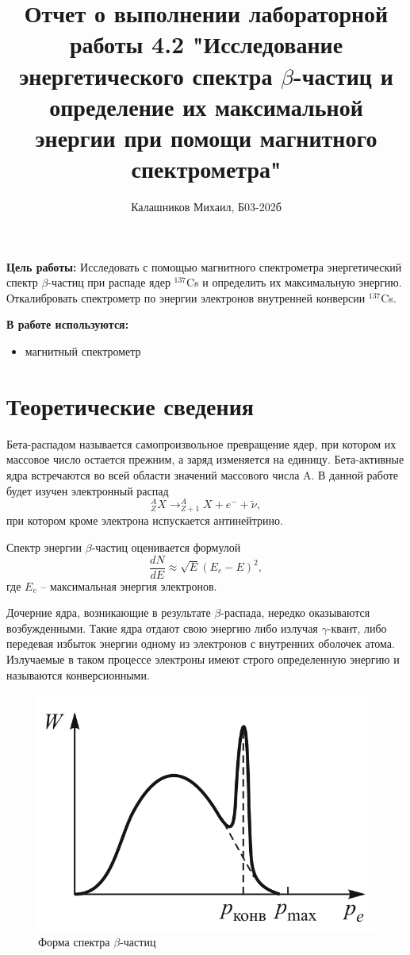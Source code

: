 \documentclass[14pt, a4paper]{report}
\title{\textbf{Отчет о выполнении лабораторной работы 4.2 "Исследование энергетического спектра $\beta$-частиц и определение их максимальной энергии при помощи магнитного спектрометра"}}
\author{Калашников Михаил, Б03-202б}
\date{}
\begin{document}
\maketitle

\textbf{Цель работы:}
Исследовать с помощью магнитного спектрометра энергетический спектр $\beta$-частиц при распаде ядер $^{137}$Cs и определить их максимальную энергию. Откалибровать спектрометр по энергии электронов внутренней конверсии $^{137}$Cs.

\textbf{В работе используются:}
\begin{itemize}
\item магнитный спектрометр
\end{itemize}

\section{Теоретические сведения}

Бета-распадом называется самопроизвольное превращение ядер, при котором их массовое число остается прежним, а заряд изменяется на единицу. Бета-активные ядра встречаются во всей области значений массового числа A.
В данной работе будет изучен электронный распад
\[^A_Z X \rightarrow _{Z+1}^A X+e^-+\tilde{\nu},\]
при котором кроме электрона испускается антинейтрино.

Спектр энергии $\beta$-частиц оценивается формулой
\[\frac{dN}{dE}\approx\sqrt{E}(E_e-E)^2,\]
где $E_e$ -- максимальная энергия электронов.

Дочерние ядра, возникающие в результате $\beta$-распада, нередко оказываются возбужденными. Такие ядра отдают свою энергию либо излучая $\gamma$-квант, либо передевая избыток энергии одному из электронов с внутренних оболочек атома. Излучаемые в таком процессе электроны имеют строго определенную энергию и называются конверсионными.

\begin{figure}[H]
\centering
\includegraphics[scale=0.5]{../images/542-1}
\caption{Форма спектра $\beta$-частиц}
\end{figure}
\end{document}
